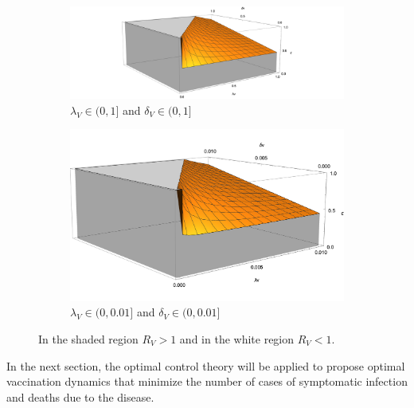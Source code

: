 \begin{figure}[h!]
\centering
\begin{subfigure}[b]{0.6\linewidth}
\includegraphics[width=\linewidth]{R0-3D-A.png}
\caption{$\lambda_V\in(0,1]$ and $\delta_V\in(0,1]$}
\label{figure4A}
\end{subfigure}
\begin{subfigure}[b]{0.35\linewidth}
\includegraphics[width=\linewidth]{R0-3D-B.png}
\caption{$\lambda_V\in(0,0.01]$ and $\delta_V\in(0,0.01]$}
\label{figure4}
\end{subfigure}
\caption{In the shaded region $ R_V> 1 $ and in the white region $ R_V <1 $.}
\label{figure4B}
\end{figure}

In the next section, the optimal control theory will be applied to propose optimal vaccination dynamics that minimize the number of cases of symptomatic infection and deaths due to the disease.